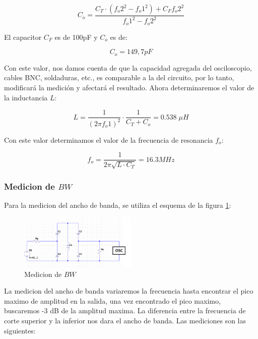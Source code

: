 \begin{equation}
    C_o = \frac{C_T \cdot (f_o2^2 - f_o1^2) + C_F f_o2^2}{f_o1^2 - f_o2^2}
\end{equation}

El capacitor $C_F$ es de 100pF y $C_o$ es de:

\begin{equation}
    C_o = 149,7 pF
\end{equation}

Con este valor, nos damos cuenta de que la capacidad agregada del osciloscopio, cables BNC, soldaduras, etc., es comparable a la del 
circuito, por lo tanto, modificará la medición y afectará el resultado. Ahora determinaremos el valor de la inductancia $L$:

\begin{equation}
    L = \frac{1}{(2\pi f_o1)^2} \cdot \frac{1}{C_T + C_o} = 0.538\; \mu H
\end{equation}

Con este valor determinamos el valor de la frecuencia de resonancia $f_o$:

\begin{equation}
    f_o = \frac{1}{2\pi\sqrt{L \cdot C_T}} = 16.3 MHz
\end{equation}

\subsubsection{Medicion de $BW$}

Para la medicion del ancho de banda, se utiliza el esquema de la figura \ref{fig: de la medicion del ancho de banda}:

\begin{figure}[h]
    \centering
    \includegraphics[width=0.5\textwidth]{Imagenes/medicion_bw.png}
    \caption{Medicion de $BW$}
    \label{fig: de la medicion del ancho de banda}
\end{figure}

La medicion del ancho de banda variaremos la frecuencia hasta encontrar el pico maximo de amplitud en la salida, una vez encontrado
el pico maximo, buscaremos -3 dB de la amplitud maxima. La diferencia entre la frecuencia de corte superior y la inferior nos dara el ancho de banda. 
Las mediciones son las siguientes:

